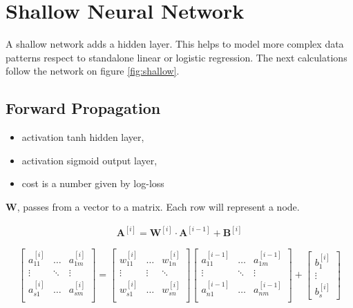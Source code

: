 \section{Shallow Neural Network}
A shallow network adds a hidden layer. This helps to model more complex data patterns respect to standalone linear or logistic regression. The next calculations follow the network on figure \ref{fig:shallow}.

\subsection{Forward Propagation}
\begin{itemize}
  \item activation tanh hidden layer, 
  \item activation sigmoid output layer,
  \item cost is a number given by log-loss
\end{itemize}

$\mathbf{W}$, passes from a vector to a matrix. Each row will represent a node.

\begin{align}
  \mathbf{A}^{[i]} = \mathbf{W}^{[i]} \cdot{} \mathbf{A}^{[i-1]} + \mathbf{B}^{[i]} \label{eq:multi}
\end{align}

\begin{equation*}
  \begin{bmatrix}
    a_{11}^{[i]} &\ldots & a_{1m}^{[i]}\\
    \vdots &\ddots & \vdots\\
    a_{s1}^{[i]}  &\ldots & a_{sm}^{[i]}\\
  \end{bmatrix}
  = 
  \begin{bmatrix}
    w_{11}^{[i]}& \ldots& w_{1n}^{[i]}\\
    \vdots& \vdots& \ddots\\
    w_{s1}^{[i]}& \ldots& w_{sn}^{[i]}\\
  \end{bmatrix}
  \begin{bmatrix}
    a^{[i-1]}_{11} & \ldots & a^{[i-1]}_{1m}\\
    \vdots & \ddots & \vdots\\
    a^{[i-1]}_{n1} & \ldots & a^{[i-1]}_{nm}\\
  \end{bmatrix}
  + \begin{bmatrix}b_1^{[i]}\\ \vdots\\ b_s^{[i]}\end{bmatrix}
\end{equation*}

